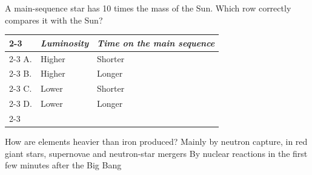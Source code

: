\begin{quizq}{}
A main-sequence star has 10 times the mass of the Sun. Which row correctly compares it with the Sun?
\begin{center}
  \renewcommand\arraystretch{1.7}
  \begin{tabular}{@{}p{10mm}|>{\centering\arraybackslash}p{45mm}|>{\centering\arraybackslash}p{45mm}|}
    \cline{2-3}
    & \textit{Luminosity} & \textit{Time on the main sequence}\\ \cline{2-3}
    A. & Higher & Shorter\\ \cline{2-3}
    B. & Higher & Longer\\ \cline{2-3}
    C. & Lower & Shorter\\ \cline{2-3}
    D. & Lower & Longer\\ \cline{2-3}
  \end{tabular}
\end{center}
\end{quizq}

\begin{quizq}{}
How are elements heavier than iron produced?
  {Mainly by neutron capture, in red giant stars, supernovae and neutron-star mergers}
  {By nuclear reactions in the first few minutes after the Big Bang}
\end{quizq}
